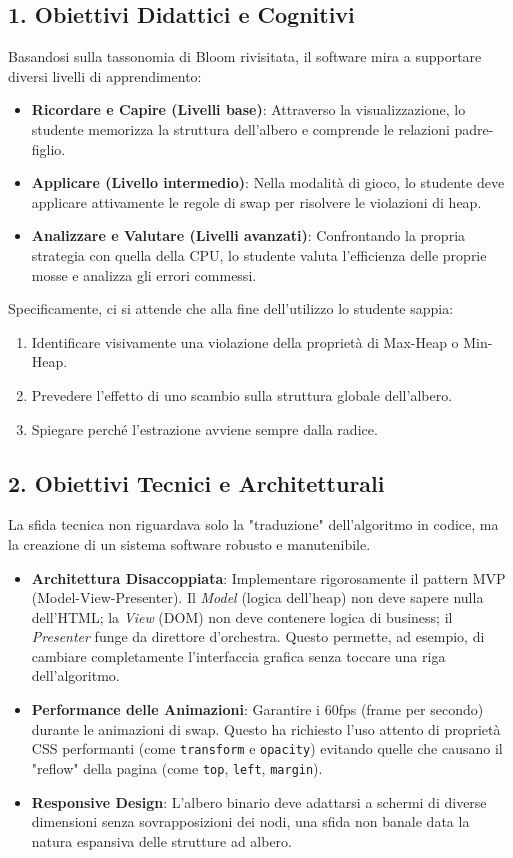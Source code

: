 \documentclass[openany]{theme/uniprthesis}
\begin{document}
\subsection{1. Obiettivi Didattici e Cognitivi}
Basandosi sulla tassonomia di Bloom rivisitata, il software mira a supportare diversi livelli di apprendimento:
\begin{itemize}
    \item \textbf{Ricordare e Capire (Livelli base)}: Attraverso la visualizzazione, lo studente memorizza la struttura dell'albero e comprende le relazioni padre-figlio.
    \item \textbf{Applicare (Livello intermedio)}: Nella modalità di gioco, lo studente deve applicare attivamente le regole di swap per risolvere le violazioni di heap.
    \item \textbf{Analizzare e Valutare (Livelli avanzati)}: Confrontando la propria strategia con quella della CPU, lo studente valuta l'efficienza delle proprie mosse e analizza gli errori commessi.
\end{itemize}
Specificamente, ci si attende che alla fine dell'utilizzo lo studente sappia:
\begin{enumerate}
    \item Identificare visivamente una violazione della proprietà di Max-Heap o Min-Heap.
    \item Prevedere l'effetto di uno scambio sulla struttura globale dell'albero.
    \item Spiegare perché l'estrazione avviene sempre dalla radice.
\end{enumerate}

\subsection{2. Obiettivi Tecnici e Architetturali}
La sfida tecnica non riguardava solo la "traduzione" dell'algoritmo in codice, ma la creazione di un sistema software robusto e manutenibile.
\begin{itemize}
    \item \textbf{Architettura Disaccoppiata}: Implementare rigorosamente il pattern MVP (Model-View-Presenter). Il \textit{Model} (logica dell'heap) non deve sapere nulla dell'HTML; la \textit{View} (DOM) non deve contenere logica di business; il \textit{Presenter} funge da direttore d'orchestra. Questo permette, ad esempio, di cambiare completamente l'interfaccia grafica senza toccare una riga dell'algoritmo.
    \item \textbf{Performance delle Animazioni}: Garantire i 60fps (frame per secondo) durante le animazioni di swap. Questo ha richiesto l'uso attento di proprietà CSS performanti (come \texttt{transform} e \texttt{opacity}) evitando quelle che causano il "reflow" della pagina (come \texttt{top}, \texttt{left}, \texttt{margin}).
    \item \textbf{Responsive Design}: L'albero binario deve adattarsi a schermi di diverse dimensioni senza sovrapposizioni dei nodi, una sfida non banale data la natura espansiva delle strutture ad albero.
\end{itemize}
\end{document}
